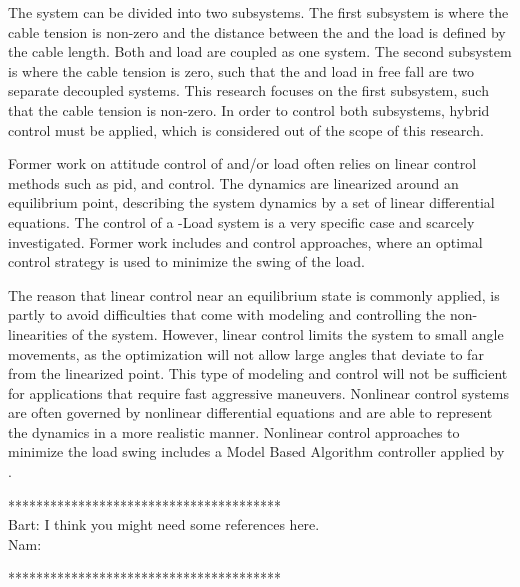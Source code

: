 The system can be divided into two subsystems. The first subsystem is where the cable tension is non-zero and the distance between the  and the load is defined by the cable length. Both  and load are coupled as one system. The second subsystem is where the cable tension is zero, such that the  and load in free fall are two separate decoupled systems. This research focuses on the first subsystem, such that the cable tension is non-zero. In order to control both subsystems, hybrid control must be applied, which is considered out of the scope of this research.

Former work on attitude control of  and/or load often relies on linear control methods such as \acs{pid},  and  control. The dynamics are linearized around an equilibrium point, describing the system dynamics by a set of linear differential equations. 
The control of a -Load system is a very specific case and scarcely investigated. Former work includes  \cite{PraveenThesis} and  control approaches, where an optimal control strategy is used to minimize the swing of the load. 

The reason that linear control near an equilibrium state is commonly applied, is partly to avoid difficulties that come with modeling and controlling the non-linearities of the system. However, linear control limits the system to small angle movements, as the optimization will not allow large angles that deviate to far from the linearized point.  
This type of modeling and control will not be sufficient for applications that require fast aggressive maneuvers.
Nonlinear control systems are often governed by nonlinear differential equations and are able to represent the dynamics in a more realistic manner. Nonlinear control approaches to minimize the load swing includes a Model Based Algorithm controller applied by \cite{Sadr2014}. 

***************************************\\
Bart: I think you might need some references here.\\
Nam:

***************************************\\

